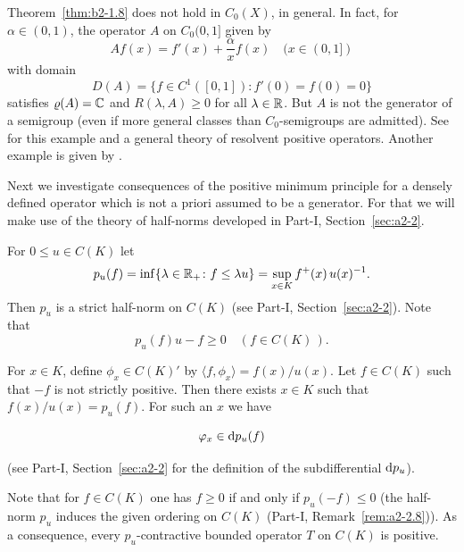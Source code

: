 \begin{remark*}\label{rem:b2-1.9-kgk2}
Theorem~\ref{thm:b2-1.8} does not hold in $C_{0}(X)$, in general.
In fact, for $\alpha \in (0,1)$,  the operator $A$ on $C_{0}(0,1]$ given by 
\[
    Af(x) = f'(x) + \frac{\alpha}{x} f(x) \quad (x \in (0,1])
\]
with domain 
\[
D(A) = \{f \in C^{1}([0,1]) \colon f'(0) = f(0) = 0\} 
\]
satisfies $\rho(A) = \C $ and 
$R(\lambda,A) \geq 0$ for all $\lambda \in \mathbb{R}$.
But $A$ is not the generator of a semigroup (even if more general classes than $C_{0}$-semigroups are admitted).
See \textcite{arendt:1987} 
for this example and a general theory of resolvent positive operators.
Another example is given by \textcite{battydavies:1983}.
\end{remark*}

Next we investigate consequences of the positive minimum principle for a densely defined operator which is not a priori assumed to be a generator.
For that we will make use of the theory of half-norms developed in Part-I, Section~\ref{sec:a2-2}.

For $0  \leq  u \in C(K)$ let
\begin{equation}\label{eq:b2-1.4}
p_{u}(f) = \inf\{\lambda \in \R_{+} \colon f \leq \lambda u\} = \sup_{x \in K} f^{+}(x)\,u(x)^{-1}.
\end{equation}
Then $p_{u}$ is a strict half-norm on $C(K)$ 
(see Part-I, Section~\ref{sec:a2-2}).
Note that
\begin{equation}\label{eq:b2-1.5}
p_{u}(f)u - f \geq 0 \quad (f \in C(K)\,).
\end{equation}

For $x \in K$, define $\phi_{x} \in C(K)'$ by $\langle f,\phi_{x} \rangle = f(x)/u(x)$.
Let $f \in C(K)$ such that $-f$ is not strictly positive.
Then there exists $x \in K$ such that $f(x)/u(x) = p_{u}(f)$.
For such an $x$ we have

\begin{equation}\label{eq:b2-1.6}
\phi_{x} \in \ddp_{u}(f)
\end{equation}


(see Part-I, Section~\ref{sec:a2-2} for the definition of the subdifferential $\mathop{}\!\mathrm{d}{p}_{u}$).

Note that for $f \in C(K)$ one has $f \geq 0$ if and only if\/ $p_{u}(-f) \leq 0$ (\ie  the half-norm $p_{u}$ induces the given ordering on $C(K)$ (\cf Part-I, Remark~\ref{rem:a2-2.8})).
As a consequence, every $p_{u}$-contractive bounded operator $T$ on $C(K)$ is positive.

